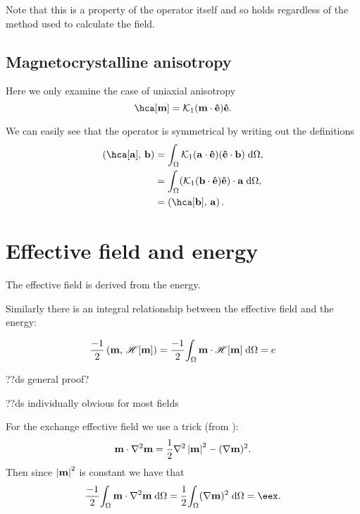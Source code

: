 Note that this is a property of the operator itself and so holds regardless of the method used to calculate the field.


\subsection{Magnetocrystalline anisotropy}

Here we only examine the case of uniaxial anisotropy
\begin{equation}
  \hca[\mv] = \kone (\mv \cdot \ev) \ev.
\end{equation}

We can easily see that the operator is symmetrical by writing out the definitions
\begin{equation}
  \begin{aligned}
    \ip{\hca[\av]}{\bv} &= \intd{ \kone (\av \cdot \ev) (\ev \cdot \bv)}, \\
    &= \intd{(\kone(\bv \cdot \ev) \ev) \cdot \av}, \\
    &= \ip{\hca[\bv]}{\av}.
  \end{aligned}
\end{equation}


\section{Effective field and energy}
\label{sec:energy-field-relation}

The effective field is derived from the energy.


Similarly there is an integral relationship between the effective field and the energy:

\begin{equation}
  \frac{-1}{2} \left(\mathbf{m},\, \mathscr{H}[\mathbf{m}] \right) = \frac{-1}{2} {\int_{\Omega} \mathbf{m} \cdot \mathscr{H}[\mathbf{m}] {\; \text{d}} {\Omega}} = e
\end{equation}

??ds general proof?

??ds individually obvious for most fields

For the exchange effective field we use a trick (from \cite[pg. 179]{Aharoni1996}):
\begin{equation}
  \mathbf{m} \cdot \nabla^2 \mathbf{m} = \frac{1}{2} \nabla^2 \left|{\mathbf{m}} \right|^2 - (\nabla \mathbf{m})^2.
\end{equation}
Then since $\left|{\mathbf{m}} \right|^2$ is constant we have that
\begin{equation}
  \frac{-1}{2} \intd{\mv \cdot \lap \mv} = \frac{1}{2} \intd{(\grad \mv)^2} = \eex.
\end{equation}


